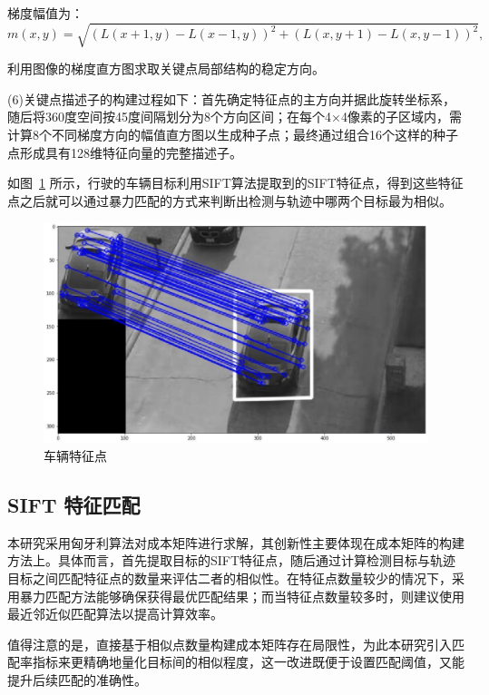 梯度幅值为：
\begin{equation}
	m(x, y) = \sqrt{(L(x + 1, y) - L(x - 1, y))^{2}+(L(x, y + 1) - L(x, y - 1))^{2}},
\end{equation}

利用图像的梯度直方图求取关键点局部结构的稳定方向。 

(6)关键点描述子的构建过程如下：首先确定特征点的主方向并据此旋转坐标系，随后将360度空间按45度间隔划分为8个方向区间；在每个4×4像素的子区域内，需计算8个不同梯度方向的幅值直方图以生成种子点；最终通过组合16个这样的种子点形成具有128维特征向量的完整描述子。

如图~\ref{fig:Car} 所示，行驶的车辆目标利用SIFT算法提取到的SIFT特征点，得到这些特征点之后就可以通过暴力匹配的方式来判断出检测与轨迹中哪两个目标最为相似。 

\begin{figure}[H]
	\centering
	\includegraphics[width=1.0\textwidth]{images/SIFT车辆.pdf}  %
	\caption{车辆特征点}
	\label{fig:Car}  %
\end{figure}

\subsection{SIFT 特征匹配}

本研究采用匈牙利算法对成本矩阵进行求解，其创新性主要体现在成本矩阵的构建方法上。具体而言，首先提取目标的SIFT特征点，随后通过计算检测目标与轨迹目标之间匹配特征点的数量来评估二者的相似性。在特征点数量较少的情况下，采用暴力匹配方法能够确保获得最优匹配结果；而当特征点数量较多时，则建议使用最近邻近似匹配算法以提高计算效率。

值得注意的是，直接基于相似点数量构建成本矩阵存在局限性，为此本研究引入匹配率指标来更精确地量化目标间的相似程度，这一改进既便于设置匹配阈值，又能提升后续匹配的准确性。

